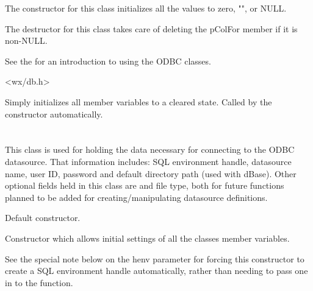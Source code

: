 The constructor for this class initializes all the values to zero, "", or NULL.

The destructor for this class takes care of deleting the pColFor member if
it is non-NULL.

See the  for
an introduction to using the ODBC classes.


<wx/db.h>


\label{wxdbcolinfinitialize}

Simply initializes all member variables to a cleared state.  Called by
the constructor automatically.

\section{}\label{wxdbconnectinf}

This class is used for holding the data necessary for connecting to the ODBC
datasource.  That information includes: SQL environment handle, datasource
name, user ID, password and default directory path (used with dBase).  Other
optional fields held in this class are and file type, both for future
functions planned to be added for creating/manipulating datasource definitions.

\label{wxdbconnectinfctor}


Default constructor.


Constructor which allows initial settings of all the classes member variables.

See the special note below on the henv parameter for forcing this constructor
to create a SQL environment handle automatically, rather than needing to pass
one in to the function.


